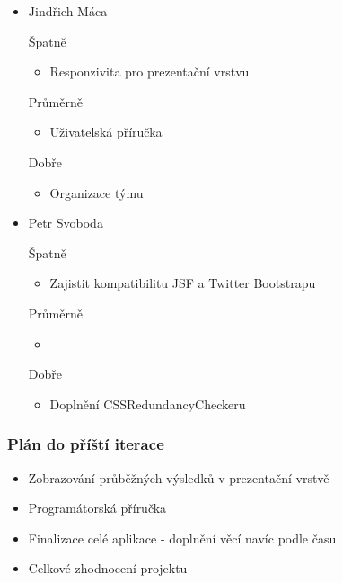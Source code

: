 \documentclass{beamer}
\begin{document}
\begin{frame}[allowframebreaks]
\begin{itemize}
    \item Jindřich Máca
      \begin{block}{Špatně} %
       \begin{itemize}
        \item Responzivita pro prezentační vrstvu
       \end{itemize}
     \end{block}
     \begin{block}{Průměrně} %
        \begin{itemize}
        \item Uživatelská příručka
       \end{itemize}
     \end{block}
     \begin{block}{Dobře} %
       \begin{itemize}
        \item Organizace týmu
       \end{itemize}
     \end{block}
   
    \item Petr Svoboda
      \begin{block}{Špatně} %
       \begin{itemize}
        \item Zajistit kompatibilitu JSF a Twitter Bootstrapu
       \end{itemize}
     \end{block}
     \begin{block}{Průměrně} %
        \begin{itemize}
				\item
       \end{itemize}
     \end{block}
     \begin{block}{Dobře} %
       \begin{itemize}
        \item Doplnění CSSRedundancyCheckeru
       \end{itemize}
     \end{block}
   \end{itemize}
\end{frame}

\begin{frame}[allowframebreaks]\frametitle{Plán do příští iterace}
  \begin{itemize}
    \item Zobrazování průběžných výsledků v prezentační vrstvě
		\item Programátorská příručka
		\item Finalizace celé aplikace - doplnění věcí navíc podle času
		\item Celkové zhodnocení projektu
  \end{itemize}
\end{frame}
\end{document}

